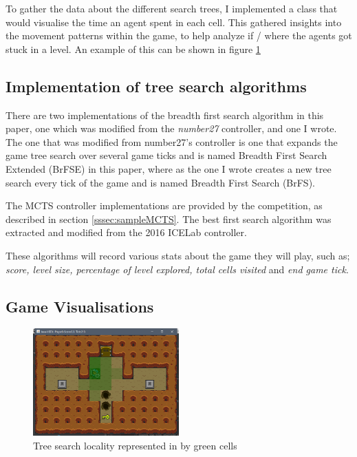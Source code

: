 \documentclass[journal]{IEEEtran}
\begin{document}
	To gather the data about the different search trees, I implemented a class that would visualise the time an agent spent in each cell. 
	This gathered insights into the movement patterns within the game, to help analyze if / where the agents got stuck in a level. An example of this can be shown in figure \ref{fig:locality}

	
	\subsection{Implementation of tree search algorithms} \label{TSImplementation}
	There are two implementations of the breadth first search algorithm in this paper, one which was modified from the \textit{number27} controller, and one I wrote. The one that was modified from number27's controller is one that expands the game tree search over several game ticks and is named Breadth First Search Extended (BrFSE) in this paper, where as the one I wrote creates a new tree search every tick of the game and is named Breadth First Search (BrFS).
	
	The MCTS controller implementations are provided by the competition, as described in section \ref{sssec:sampleMCTS}.
	The best first search algorithm was extracted and modified from the 2016 ICELab controller.

	These algorithms will record various stats about the game they will play, such as; \textit{score, level size, percentage of level explored, total cells visited} and \textit{end game tick}.
	
	\subsection{Game Visualisations}
	
	\begin{figure}[h]
		   \centering
		   \includegraphics[width=0.5\textwidth]{BrFS-Locality}
		   \caption{ Tree search locality represented in by green cells }
		   \label{fig:locality}
	\end{figure}
\end{document}
